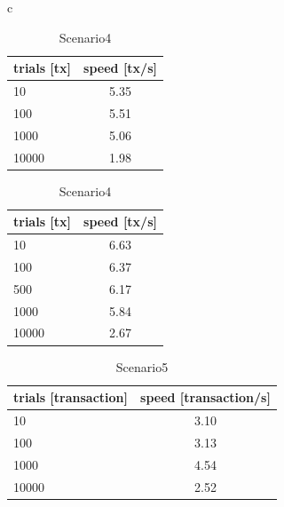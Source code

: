 \documentclass[a4paper, oneside]{discothesis}
\begin{document}
\begin{table}[htbp]
    \begin{center}
        \begin{tabular}{c}

            \begin{minipage}{0.5\hsize}
                \begin{center}
                    \caption{Scenario3}
                    \begin{tabular}{|l|c|} \hline
                        trials [tx] & speed [tx/s]\\ \hline \hline
                        10 & 5.35 \\
                        100 & 5.51 \\
                        1000 & 5.06 \\
                        10000 & 1.98 \\ \hline
                    \end{tabular}
                \end{center}
            \end{minipage}

            \begin{minipage}{0.5\hsize}
                \begin{center}
                    \caption{Scenario4}
                    \begin{tabular}{|l|c|} \hline
                        trials [tx] & speed [tx/s]\\ \hline \hline
                        10 & 6.63\\
                        100 & 6.37\\
                        500 & 6.17\\
                        1000 & 5.84\\
                        10000 & 2.67\\ \hline
                    \end{tabular}
                \end{center}
            \end{minipage}

        \end{tabular}
    \end{center}
\end{table}

\begin{table}[htb]
  \begin{center}
    \caption{Scenario5}
    \begin{tabular}{|l|c|} \hline
        trials [transaction] & speed [transaction/s]\\ \hline \hline
        10 & 3.10 \\
        100 & 3.13 \\
        1000 & 4.54 \\
        10000 & 2.52 \\ \hline
    \end{tabular}
  \end{center}
\end{table}
\end{document}
